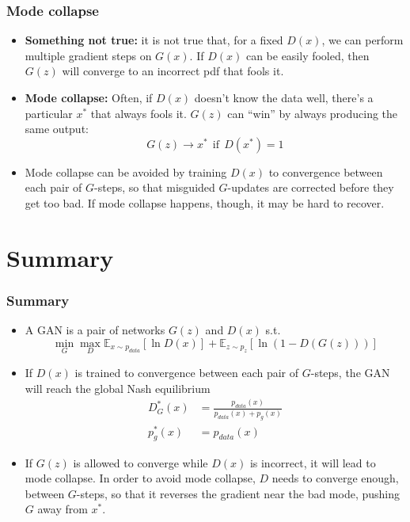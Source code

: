 \documentclass{beamer}
\begin{document}
\begin{frame}
  \frametitle{Mode collapse}

  \begin{itemize}
  \item {\bf Something not true:} it is not true that, for a fixed
    $D(x)$, we can perform multiple gradient steps on $G(x)$.  If
    $D(x)$ can be easily fooled, then  $G(z)$ will converge to an
    incorrect pdf that fools it.
  \item {\bf Mode collapse:} Often, if $D(x)$ doesn't know the data
    well, there's a particular $x^*$ that always fools it.  $G(z)$ can
    ``win'' by always producing the same output:
    \begin{displaymath}
      G(z)\rightarrow x^* ~~\mbox{if}~~D(x^*)=1
    \end{displaymath}
  \item Mode collapse can be avoided by training $D(x)$ to convergence
    between each pair of $G$-steps, so that misguided $G$-updates are
    corrected before they get too bad.  If mode collapse happens,
    though, it may be hard to recover.
  \end{itemize}
\end{frame}
  
\section{Summary}
\setcounter{subsection}{1}

\begin{frame}
  \frametitle{Summary}
  \begin{itemize}
  \item A GAN is a pair of networks $G(z)$ and $D(x)$ s.t.
    \begin{displaymath}
      \min_G\max_D
      \mathbb{E}_{x\sim p_{data}}\left[\ln D(x)\right]
      +\mathbb{E}_{z\sim p_z}\left[\ln\left(1-D(G(z))\right)\right]
    \end{displaymath}
  \item If $D(x)$ is trained to convergence between each pair of
    $G$-steps, the GAN will reach the global Nash equilibrium
    \begin{align*}
      D^*_G(x) &= \frac{p_{data}(x)}{p_{data}(x)+p_g(x)}\\
      p^*_g(x) &= p_{data}(x)
    \end{align*}
  \item If $G(z)$ is allowed to converge while $D(x)$ is incorrect, it
    will lead to mode collapse.  In order to avoid mode collapse, $D$
    needs to converge enough, between $G$-steps, so that it reverses
    the gradient near the bad mode, pushing $G$ away from $x^*$.
  \end{itemize}
\end{frame}
\end{document}
